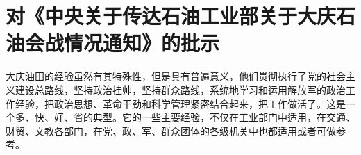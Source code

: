 \section[对《中央关于传达石油工业部关于大庆石油会战情况通知》的批示（一九六四年二月五日）]{对《中央关于传达石油工业部关于大庆石油会战情况通知》的批示}


大庆油田的经验虽然有其特殊性，但是具有普遍意义，他们贯彻执行了党的社会主义建设总路线，坚持政治挂帅，坚持群众路线，系统地学习和运用解放军的政治工作经验，把政治思想、革命干劲和科学管理紧密结合起来，把工作做活了。这是一个多、快、好、省的典型。它的一些主要经验，不仅在工业部门中适用，在交通、财贸、文教各部门，在党、政、军、群众团体的各级机关中也都适用或者可做参考。


